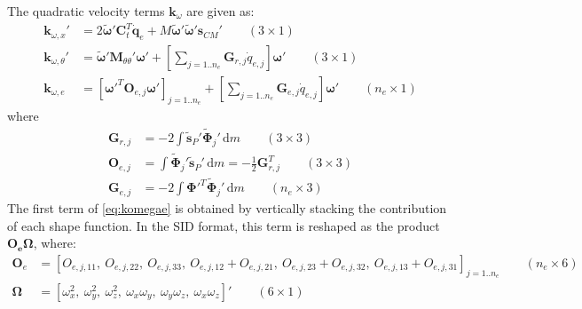 \documentclass[wes, manuscript]{copernicus}
\renewcommand{\d}{\mathrm{d}}
\renewcommand{\v}[1]{\boldsymbol{#1}}
\newcommand{\m}[1]{\boldsymbol{#1}}
\newcommand{\M} {{\m{M}}}
\newcommand{\stil}  {\m{\tilde{s}}}
\renewcommand{\d}{\mathrm{d}}
\newcommand{\dm}{\d{m}}
\begin{document}
The quadratic velocity terms $\v{k}_\omega$  are given as:
\begin{align}
  \v{k}_{\omega, x}'       & = 2\v{\tilde{\omega}}'  \v{C}_t^T \v{\dot{q}}_e
      + 
M\v{\tilde{\omega}}' 
 \v{\tilde{\omega}}' 
\v{s}_{CM}'
 \qquad (3\times 1)
  \\
  \v{k}_{\omega, \theta}'  & = \v{\tilde{\omega}}'\M_{\theta\theta}'\v{\omega}'         
   +\left[\sum\limits_{j=1..n_e}  \v{G}_{r,j} \dot{q}_{e,j}\right] \v{\omega}'
 \qquad (3\times 1)
  \\
  \v{k}_{\omega, e}   & =  \left[  \v{\omega}'^T \m{O}_{e,j}\v{\omega}'\right]_{j=1..n_e} 
  + 
    \left[\sum\limits_{j=1..n_e}   \m{G}_{e,j} \dot{q}_{e,j}\right] \v{\omega}'
 \qquad (n_e\times 1)
 \label{eq:komegae}
\end{align}
where
\begin{align}
    \m{G}_{r,j} &=  -2 \int   \stil_P' \m{\tilde{\Phi}}_j' \,\dm \qquad (3\times 3) 
        \\
    \m{O}_{e,j} &=  \int  \m{\tilde{\Phi}}_j' \stil_P'\,\dm = -\frac{1}{2}  \m{G}_{r,j}^T  \qquad (3\times 3) 
    \\
    \m{G}_{e,j} &=  -2 \int  \m{\Phi'}^T \m{\tilde{\Phi}}_j' \,\dm \qquad (n_e\times 3) 
\end{align}
The first term of \autoref{eq:komegae} is obtained by vertically stacking the contribution of each shape function. In the SID format, this term 
is reshaped as the product $\m{O_e}\v{\Omega}$, where: 
\begin{align}
  \m{O}_e &= \left[O_{e,j,11},\ O_{e,j,22},\  O_{e,j,33},\ O_{e,j,12}+O_{e,j,21},\ O_{e,j,23}+O_{e,j,32},\ O_{e,j,13}+O_{e,j,31}\right]_{j=1..n_e}  \qquad (n_e\times 6)
       \\
 \v{\Omega} &=  \left[\omega_x^2,\ \omega_y^2,\ \omega_z^2,\ \omega_x \omega_y,\ \omega_y \omega_z,\ \omega_x \omega_z \right]' \qquad (6\times 1)
\end{align}
\end{document}
